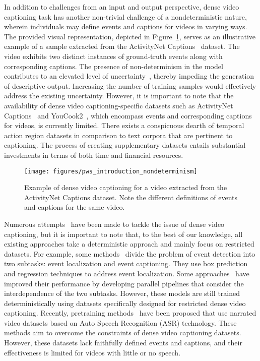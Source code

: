 In addition to challenges from an input and output perspective, dense video captioning task has another non-trivial challenge of a nondeterministic nature, wherein individuals may define events and captions for videos in varying ways.
The provided visual representation, depicted in Figure~\ref{fig:nondeterminism}, serves as an illustrative example of a sample extracted from the ActivityNet Captions~\cite{Krishna2017-pw} dataset.
The video exhibits two distinct instances of ground-truth events along with corresponding captions.
The presence of non-determinism in the model contributes to an elevated level of uncertainty~\cite{Summers2021-mz}, thereby impeding the generation of descriptive output.
Increasing the number of training samples would effectively address the existing uncertainty.
However, it is important to note that the availability of dense video captioning-specific datasets such as ActivityNet Captions~\cite{Krishna2017-pw} and YouCook2~\cite{Zhou2018-eq}, which encompass events and corresponding captions for videos, is currently limited.
There exists a conspicuous dearth of temporal action region datasets in comparison to text corpora that are pertinent to captioning.
The process of creating supplementary datasets entails substantial investments in terms of both time and financial resources.

\begin{figure}[t]
    \centering
    \texttt{[image: figures/pws\_introduction\_nondeterminism]}
    \caption{Example of dense video captioning for a video extracted from the ActivityNet Captions dataset.
        Note the different definitions of events and captions for the same video.}
    \label{fig:nondeterminism}
\end{figure}



Numerous attempts~\cite{Wang2023-tu,Aafaq2023-vk,Zhang2022-ni,Zhu2022-mg,Yang2023-fm,Choi2022-cu,Iashin2020-ln,Wang2021-xe,Suin2020-tq,Zhou2018-zu,Wang2018-ap,Mun2019-ap,Krishna2017-pw,Li2018-ll,Deng2021-qd,Wang2021-zi,Choi2023-so} have been made to tackle the issue of dense video captioning, but it is important to note that, to the best of our knowledge, all existing approaches take a deterministic approach and mainly focus on restricted datasets.
For example, some methods~\cite{Krishna2017-pw,Wang2018-ap,Li2018-ll,Mun2019-ap,Choi2023-so} divide the problem of event detection into two subtasks: event localization and event captioning.
They use box prediction and regression techniques to address event localization.
Some approaches~\cite{Deng2021-qd,Wang2021-zi,Choi2022-cu} have improved their performance by developing parallel pipelines that consider the interdependence of the two subtasks.
However, these models are still trained deterministically using datasets specifically designed for restricted dense video captioning.
Recently, pretraining methods~\cite{Yang2023-fm} have been proposed that use narrated video datasets based on Auto Speech Recognition (ASR) technology.
These methods aim to overcome the constraints of dense video captioning datasets.
However, these datasets lack faithfully defined events and captions, and their effectiveness is limited for videos with little or no speech.

